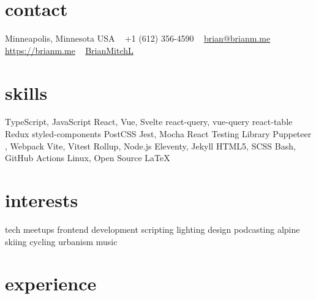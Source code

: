 \documentclass[]{cv-style} %
\begin{document}
\lastupdated


\begin{aside} %
\section{contact}
\small{Minneapolis, Minnesota USA}
~
+1 (612) 356-4590
~
\href{mailto:brian@brianm.me}{brian@brianm.me}
~
\href{https://brianm.me}{https://brianm.me}
~
\href{https://github.com/BrianMitchL}{\textcolor{headercolor}{ }BrianMitchL}
\section{skills}
TypeScript, JavaScript
React, Vue, Svelte
react-query, vue-query
react-table
Redux
styled-components
PostCSS
Jest, Mocha
React Testing Library
Puppeteer
, Webpack
Vite, Vitest
Rollup, Node.js
Eleventy, Jekyll
HTML5, SCSS
Bash, GitHub Actions
Linux, Open Source
\LaTeX
\section{interests}
tech meetups
frontend development
scripting
lighting design
podcasting
alpine skiing
cycling
urbanism
music
\end{aside}



\section{experience}

%
%
%
%
\end{document}
